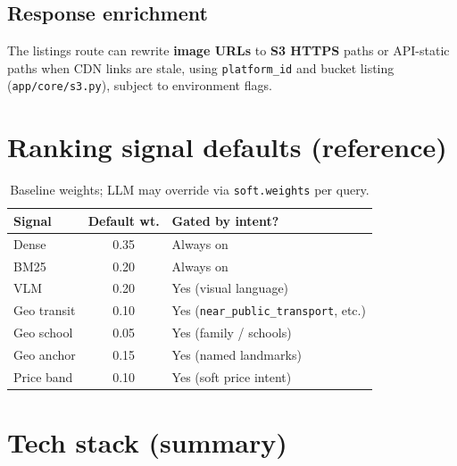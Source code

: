 \documentclass[11pt]{article}
\begin{document}
\subsection{Response enrichment}
The listings route can rewrite \textbf{image URLs} to \textbf{S3 HTTPS} paths or API-static paths when CDN links are stale, using \texttt{platform\_id} and bucket listing (\texttt{app/core/s3.py}), subject to environment flags.

\section{Ranking signal defaults (reference)}

\begin{table}[h]
\centering
\small
\begin{tabular}{@{}lcp{5.2cm}@{}}
\toprule
\textbf{Signal} & \textbf{Default wt.} & \textbf{Gated by intent?} \\
\midrule
Dense & 0.35 & Always on \\
BM25 & 0.20 & Always on \\
VLM & 0.20 & Yes (visual language) \\
Geo transit & 0.10 & Yes (\texttt{near\_public\_transport}, etc.) \\
Geo school & 0.05 & Yes (family / schools) \\
Geo anchor & 0.15 & Yes (named landmarks) \\
Price band & 0.10 & Yes (soft price intent) \\
\bottomrule
\end{tabular}
\caption{Baseline weights; LLM may override via \texttt{soft.weights} per query.\label{tab:weights}}
\end{table}

\section{Tech stack (summary)}
\end{document}
